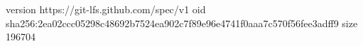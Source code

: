 version https://git-lfs.github.com/spec/v1
oid sha256:2ea02ccc05298c48692b7524ea902c7f89e96e4741f0aaa7c570f56fee3adff9
size 196704
